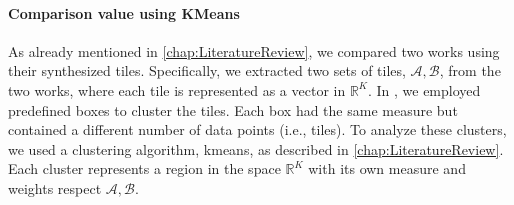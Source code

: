 \paragraph{Comparison value using KMeans}
\begin{modified} As already mentioned in \cref{chap:LiteratureReview}, we compared two works using their synthesized tiles. Specifically, we extracted two sets of tiles, $\mathcal{A},\mathcal{B}$, from the two works, where each tile is represented as a vector in $\mathbb{R}^K$. In \cite{thesis}, we employed predefined boxes to cluster the tiles. Each box had the same measure but contained a different number of data points (i.e., tiles). To analyze these clusters, we used a clustering algorithm, \gls{kmeans}, as described in \cref{chap:LiteratureReview}. Each cluster represents a region in the space $\mathbb{R}^K$ with its own measure and weights respect $\mathcal{A}, \mathcal{B}$.


\end{modified}
